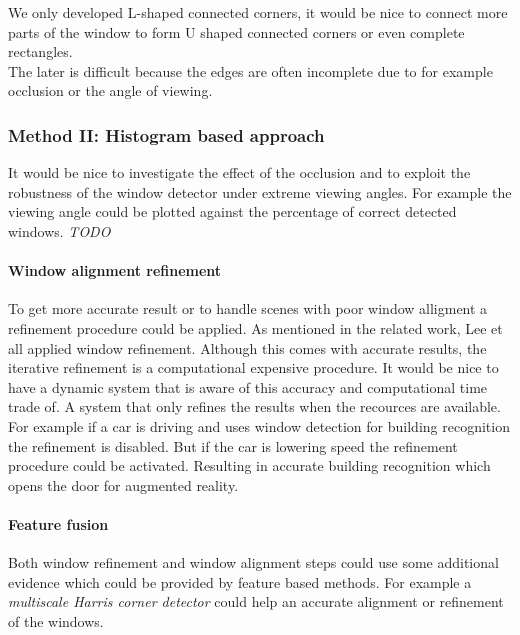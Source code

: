 We only developed L-shaped connected corners, it would be nice to connect more
parts of the window to form U shaped connected corners or even complete rectangles.\\
The later is difficult because the edges are often incomplete due to for example occlusion 
or the angle of viewing.


\subsubsection{Method II: Histogram based approach} 
It would be nice to investigate the effect of the occlusion and to exploit the
robustness of the window detector under extreme viewing angles.
For example the viewing angle could be plotted against the percentage of
correct detected windows.
\emph{TODO}


\paragraph{Window alignment refinement}
To get more accurate result or to handle scenes with poor window alligment a refinement procedure could be applied.
As mentioned in the related work, Lee et all \cite{Lee_extraction} applied window refinement.
Although this comes with accurate results, the iterative refinement is a
computational expensive procedure. 
It would be nice to have a dynamic system that is aware of this 
accuracy and computational time trade of. A system that only refines the results when the recources are available.
For example if a car is driving and uses window detection for building recognition the refinement is disabled.
But if the car is lowering speed the refinement procedure could be activated.
Resulting in accurate building recognition which opens the door for augmented reality.

\paragraph{Feature fusion}
Both window refinement and window alignment steps could use some additional
evidence which could be provided by feature based methods.  For example a
\emph{multiscale Harris corner detector} could help an accurate alignment or
refinement of the windows.











% 
% 
% 
% 
% 
% 
% 
% 
